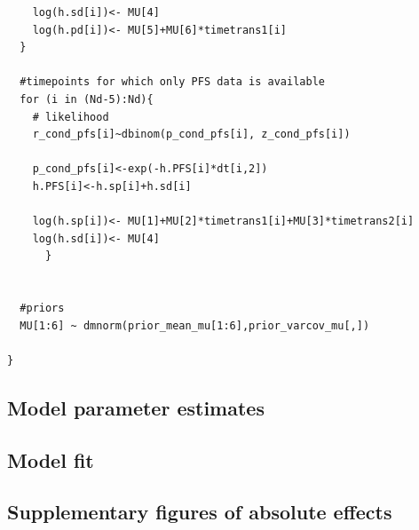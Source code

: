 \documentclass[11pt,final,fleqn]{article}\usepackage[]{graphicx}\usepackage[]{color}
\theoremstyle{plain}
\begin{document}
\begin{appendices}
\begin{verbatim}
    log(h.sd[i])<- MU[4]
    log(h.pd[i])<- MU[5]+MU[6]*timetrans1[i]
  }
    
  #timepoints for which only PFS data is available 
  for (i in (Nd-5):Nd){
    # likelihood
    r_cond_pfs[i]~dbinom(p_cond_pfs[i], z_cond_pfs[i]) 
    
    p_cond_pfs[i]<-exp(-h.PFS[i]*dt[i,2])
    h.PFS[i]<-h.sp[i]+h.sd[i]
    
    log(h.sp[i])<- MU[1]+MU[2]*timetrans1[i]+MU[3]*timetrans2[i] 
    log(h.sd[i])<- MU[4] 
      }
  
  
  #priors
  MU[1:6] ~ dmnorm(prior_mean_mu[1:6],prior_varcov_mu[,]) 

}

\end{verbatim}

\subsection{Model parameter estimates}




\subsection{Model fit}\label{app:DIC-2l}

\subsection{Supplementary figures of absolute effects}\label{app:2l-supp-figs}


\end{appendices}
\end{document}
